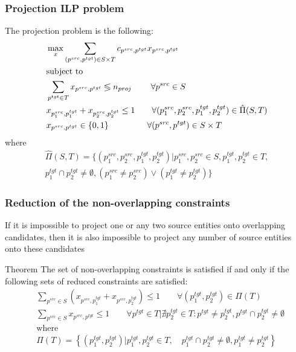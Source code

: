 \documentclass{beamer}
\newcommand{\src}[1]{#1^{src}}
\newcommand{\tgt}[1]{#1^{tgt}}
\begin{document}
\begin{frame}
  \frametitle{Projection ILP problem}

  The projection problem is the following:
  \begin{align*}
    & \max\limits_x \sum\limits_{(\src{p}, \tgt{p}) \in S \times T} c_{\src{p}, \tgt{p}} x_{\src{p}, \tgt{p}} \\
    & \text{subject to}                                                                                                                      \\
    & \sum\limits_{\tgt{p} \in T} x_{\src{p}, \tgt{p}} \lessgtr n_{proj}
    \; \qquad \forall \src{p} \in S \\
    & x_{\src{p_1}, \tgt{p_1}} + x_{\src{p_2}, \tgt{p_2}} \leq 1
    \qquad \forall (\src{p_1}, \src{p_2}, \tgt{p_1}, \tgt{p_2}) \in \hat{\Pi}(S, T) \\
    & x_{\src{p}, \tgt{p}} \in \{ 0, 1 \}
    \; \;\qquad \qquad \forall (\src{p}, \tgt{p}) \in S \times T \notag
  \end{align*}
  where
  \begin{align*}
    \hat{\Pi}(S, T) = \Big\{ (\src{p_1}, \src{p_2}, \tgt{p_1}, \tgt{p_2}) \Big| \src{p_1}, \src{p_2} \in S, \tgt{p_1}, \tgt{p_2} \in T, \\
      \tgt{p_1} \cap \tgt{p_2} \neq \emptyset,
    (\src{p_1} \neq \src{p_2}) \lor (\tgt{p_1} \neq \tgt{p_2}) \Big\}
  \end{align*}
\end{frame}

\begin{frame}
  \frametitle{Reduction of the non-overlapping constraints}

  If it is impossible to project one or any two source entities onto overlapping
  candidates, then it is also impossible to project any number of source entities
  onto these candidates

  \begin{block}{Theorem}
    The set of non-overlapping constraints is satisfied if and only if
    the following sets of reduced constraints are satisfied:
    \begin{align*}
      & \sum\limits_{\src{p} \in S} (x_{\src{p}, \tgt{p_1}} + x_{\src{p}, \tgt{p_2}}) \leq 1
      \qquad \forall (\tgt{p_1}, \tgt{p_2}) \in \Pi(T) \\
      & \sum\limits_{\src{p} \in S} x_{\src{p}, \tgt{p}} \leq 1
      \qquad \forall \tgt{p} \in T \Big| \nexists \tgt{p_2} \in T: \tgt{p} \neq \tgt{p_2}, \tgt{p} \cap \tgt{p_2} \neq \emptyset                                             \\
      & \text{where} \\
      & \Pi(T) = \left\{ (\tgt{p_1}, \tgt{p_2}) \Big| \tgt{p_1}, \tgt{p_2} \in T,
        \quad \tgt{p_1} \cap \tgt{p_2} \neq \emptyset,
      \tgt{p_1} \neq \tgt{p_2} \right\}
    \end{align*}
  \end{block}

\end{frame}
\end{document}
